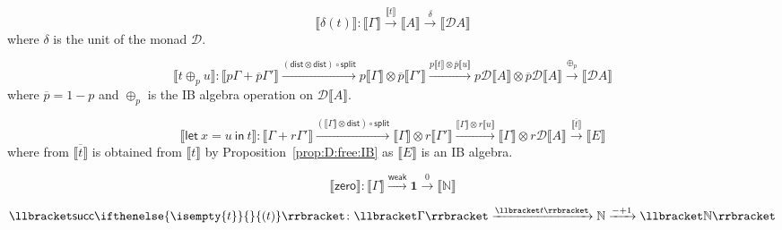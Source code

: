 \documentclass[a4paper,UKenglish,cleveref, autoref, thm-restate]{lipics-v2021}
\providecommand*{\ifempty}[3]{\ifthenelse{\isempty{#1}}{#2}{#3}}
\newcommand{\parensmathoper}[2]{\ensuremath{#1\ifempty{#2}{}{(#2)}}}
\newcommand{\mprod}{\otimes}
\newcommand{\unit}{\mathbf{1}}
\newcommand{\nat}{\mathbb{N}}
\newcommand{\D}{\mathcal{D}}
\newcommand{\splt}{\mathsf{split}}
\newcommand{\distribute}{\mathsf{dist}}
\newcommand{\semweak}{\mathsf{weak}}
\newcommand{\letIn}[2]{\mathsf{let~} #1 \mathsf{~in~} #2}
\newcommand{\Zero}{\mathsf{zero}}
\newcommand{\Succ}{\parensmathoper{\mathsf{succ}}}
\newcommand{\TD}{\mathcal{D}}
\newcommand{\den}[1]{\llbracket #1\rrbracket}
\begin{document}
\begin{description}[font=\sc,wide]
\item[Case ($\delta$):]
\begin{equation*}
    \den{\delta(t)} \colon 
    \den{\Gamma}
        \xrightarrow{\den{t}}
    \den{A}
        \xrightarrow{\delta}
    \den{\TD A}
\end{equation*}
where $\delta$ is the unit of the monad $\D$.

\item[Case ($\oplus_p$):]
\begin{equation*}
    \den{t \oplus_p u} \colon 
    \den{p\Gamma+\overline{p}\Gamma'}
        \xrightarrow{(\distribute\mprod\distribute)\circ\splt}
    p\den{\Gamma}\mprod \overline{p}\den{\Gamma'}
        \xrightarrow{p\den{t} \mprod \overline{p}\den{u}}
    p\D\den{A}\mprod \overline{p}\D\den{A}
        \xrightarrow{\oplus_p}
    \den{\TD A}
\end{equation*}
where $\overline{p} = 1-p$ and $\oplus_p$ is the IB algebra operation
on $\D \den{A}$.

\item[Case (let):]
\begin{equation*}
    \den{\letIn{x=u}{t}} \colon \den{\Gamma+r\Gamma'}
        \xrightarrow{(\den{\Gamma}\mprod\distribute)\circ\splt}
    \den{\Gamma}\mprod r\den{\Gamma'}
        \xrightarrow{\den{\Gamma}\mprod r\den{u}}
    \den{\Gamma}\mprod r\D\den{A}
        \xrightarrow{\overline{\den{t}}}
    \den{E}
\end{equation*}
where from $\overline{\den{t}}$ is obtained from $\den{t}$ by Proposition~\ref{prop:D:free:IB} as $\den{E}$ is an IB algebra.

\item[Case (zero):]
\begin{equation*}
    \den{\Zero} \colon \den{\Gamma} 
        \xrightarrow{\semweak}
    \unit
        \xrightarrow{0}
    \den{\nat}
\end{equation*}

\item[Case (succ):]
\begin{equation*}
    \den{\Succ{t}} \colon \den{\Gamma}
        \xrightarrow{\den{t}}
    \nat
        \xrightarrow{-+1}
    \den{\nat}
\end{equation*}   


\end{description}
\end{document}
